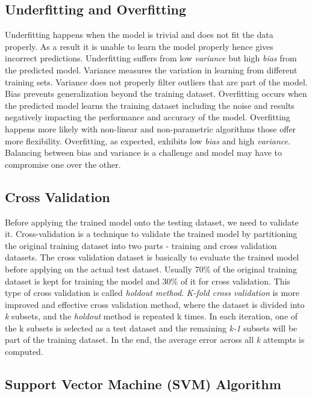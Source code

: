 \documentclass[sigconf]{acmart}
\begin{document}
	\subsection{Underfitting and Overfitting}
	Underfitting happens when the model is trivial and does not fit the data properly. As a result it is unable to learn the model properly hence gives incorrect predictions. Underfitting suffers from low {\em variance} but high {\em bias} from the predicted model. Variance measures the variation in learning from different training sets.  Variance does not properly filter outliers that are part of the model. Bias prevents generalization beyond the training dataset. Overfitting occurs when the predicted model learns the training dataset including the noise and results negatively impacting the performance and accuracy of the model. Overfitting happens more likely with non-linear and non-parametric algorithms those offer more flexibility. Overfitting, as expected, exhibits low {\em bias} and high {\em variance}. Balancing between bias and variance is a challenge and model may have to compromise one over the other. 
	
	\subsection{Cross Validation}
	
    Before applying the trained model onto the testing dataset, we need to validate it. Cross-validation is a technique to validate the trained model by partitioning the original training dataset into two parts - training and cross validation datasets. The cross validation dataset is basically to evaluate the trained model before applying on the actual test dataset. Usually 70\% of the original training dataset is kept for training the model and 30\% of it for cross validation. This type of cross validation is called {\em holdout  method}. {\em K-fold cross validation} is more improved and effective cross validation method, where the dataset is divided into {\em k} subsets, and the {\em holdout} method is repeated k times. In each iteration, one of the k subsets is selected as a test dataset and the remaining {\em k-1} subsets will be part of the training dataset. In the end, the average error across all {\em k} attempts is computed.
	 
	\subsection{Support Vector Machine (SVM) Algorithm}
\end{document}
